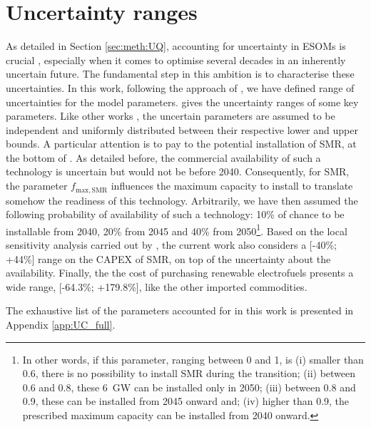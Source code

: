 \section{Uncertainty ranges}
\label{sec:cs:uncertainty}
As detailed in Section \ref{sec:meth:UQ}, accounting for uncertainty in \gls{ESOMs} is crucial \cite{mavromatidis2018uncertainty}, especially when it comes to optimise several decades in an inherently uncertain future. The fundamental step in this ambition is to characterise these uncertainties. In this work, following the approach of \citet{Moret2017PhDThesis}, we have defined range of uncertainties for the model parameters.  gives the uncertainty ranges of some key parameters. Like other works \cite{li2019renewables,coppitters2021robust}, the uncertain parameters are assumed to be independent and uniformly distributed between their respective lower and upper bounds. A particular attention is to pay to the potential installation of \gls{SMR}, at the bottom of . As detailed before, the commercial availability of such a technology is uncertain but would not be before 2040. Consequently, for \gls{SMR}, the parameter $f_{\mathrm{max,SMR}}$ influences the maximum capacity to install to translate somehow the readiness of this technology. Arbitrarily, we have then assumed the following probability of availability of such a technology: 10\% of chance to be installable from 2040, 20\% from 2045 and 40\% from 2050\footnote{In other words, if this parameter, ranging between 0 and 1, is (i) smaller than 0.6, there is no possibility to install \gls{SMR} during the transition; (ii) between 0.6 and 0.8, these 6~GW can be installed only in 2050; (iii) between 0.8 and 0.9, these can be installed from 2045 onward and; (iv) higher than 0.9, the prescribed maximum capacity can be installed from 2040 onward. }. Based on the local sensitivity analysis carried out by \citet{PATHS2050}, the current work also considers a [-40\%; +44\%] range on the CAPEX of SMR, on top of the uncertainty about the availability. Finally, the the cost of purchasing renewable electrofuels presents a wide range, [-64.3\%; +179.8\%], like the other imported commodities.

The exhaustive list of the parameters accounted for in this work is presented in Appendix \ref{app:UC_full}.

